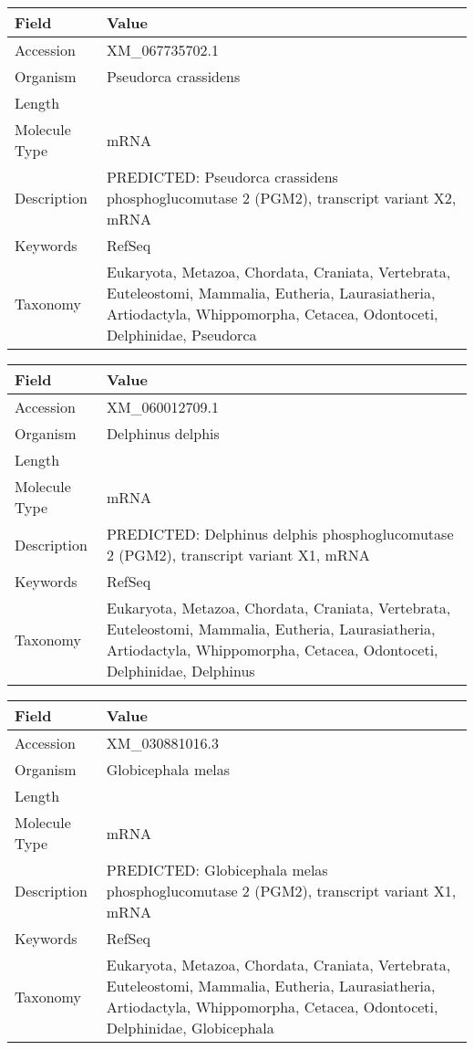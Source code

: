 \documentclass[10pt]{article}
\begin{document}
\vspace{1em}
{\footnotesize
\begin{longtable}{>{\raggedright\arraybackslash}p{4.5cm} >{\raggedright\arraybackslash}p{11.5cm}}
\textbf{Field} & \textbf{Value} \\
\hline
Accession & XM\_067735702.1 \\
Organism & Pseudorca crassidens \\
Length & 12582 \\
Molecule Type & mRNA \\
Description & PREDICTED: Pseudorca crassidens phosphoglucomutase 2 (PGM2), transcript variant X2, mRNA \\
Keywords & RefSeq \\
Taxonomy & Eukaryota, Metazoa, Chordata, Craniata, Vertebrata, Euteleostomi, Mammalia, Eutheria, Laurasiatheria, Artiodactyla, Whippomorpha, Cetacea, Odontoceti, Delphinidae, Pseudorca \\
\end{longtable}
}

\vspace{1em}
{\footnotesize
\begin{longtable}{>{\raggedright\arraybackslash}p{4.5cm} >{\raggedright\arraybackslash}p{11.5cm}}
\textbf{Field} & \textbf{Value} \\
\hline
Accession & XM\_060012709.1 \\
Organism & Delphinus delphis \\
Length & 6792 \\
Molecule Type & mRNA \\
Description & PREDICTED: Delphinus delphis phosphoglucomutase 2 (PGM2), transcript variant X1, mRNA \\
Keywords & RefSeq \\
Taxonomy & Eukaryota, Metazoa, Chordata, Craniata, Vertebrata, Euteleostomi, Mammalia, Eutheria, Laurasiatheria, Artiodactyla, Whippomorpha, Cetacea, Odontoceti, Delphinidae, Delphinus \\
\end{longtable}
}

\vspace{1em}
{\footnotesize
\begin{longtable}{>{\raggedright\arraybackslash}p{4.5cm} >{\raggedright\arraybackslash}p{11.5cm}}
\textbf{Field} & \textbf{Value} \\
\hline
Accession & XM\_030881016.3 \\
Organism & Globicephala melas \\
Length & 6886 \\
Molecule Type & mRNA \\
Description & PREDICTED: Globicephala melas phosphoglucomutase 2 (PGM2), transcript variant X1, mRNA \\
Keywords & RefSeq \\
Taxonomy & Eukaryota, Metazoa, Chordata, Craniata, Vertebrata, Euteleostomi, Mammalia, Eutheria, Laurasiatheria, Artiodactyla, Whippomorpha, Cetacea, Odontoceti, Delphinidae, Globicephala \\
\end{longtable}
}
\end{document}
